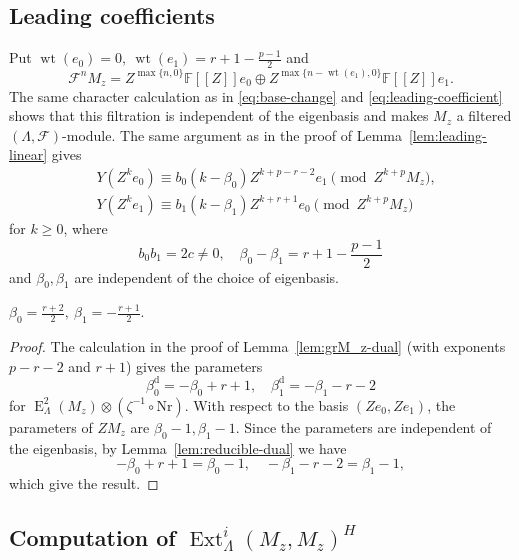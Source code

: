 \documentclass[11pt,a4paper]{article} %
\def\FF{\mathbb{F}}
\def\cF{\mathcal{F}}
\def\d{\operatorname{d}}
\def\E{\operatorname{E}}
\def\Ext{\operatorname{Ext}} %
\def\max{\operatorname{max}}
\def\wet{\operatorname{wt}}
\begin{document}
\subsection{Leading coefficients}
Put $\wet(e_0)=0,~\wet(e_1)=r+1-\frac{p-1}{2}$ and
\[
\cF^nM_z
=Z^{\max\{n,0\}}\FF[[Z]]e_0
\oplus Z^{\max\{n-\wet(e_1),0\}}\FF[[Z]]e_1.
\]
The same character calculation as in \eqref{eq:base-change} and \eqref{eq:leading-coefficient} shows that this filtration
is independent of the eigenbasis and makes $M_z$ a filtered
$(\Lambda,\cF)$-module. The same argument as in the proof of Lemma~\ref{lem:leading-linear} gives
\begin{equation}\label{eq:leading-coefficient-red}
\begin{split}
    &Y(Z^ke_0)\equiv b_0(k-\beta_0)Z^{k+p-r-2}e_1\pmod{Z^{k+p}M_z},\\
    &Y(Z^ke_1)\equiv b_1(k-\beta_1)Z^{k+r+1}e_0\pmod{Z^{k+p}M_z}
\end{split}
\end{equation}
for $k\ge0$, where 
\[
b_0b_1=2c\ne0,\quad\beta_0-\beta_1=r+1-\frac{p-1}{2}
\]
and $\beta_0,\beta_1$ are independent of the choice of eigenbasis.

\begin{proposition}\label{prop:reducible-leading-coefficients}
$\beta_0=\frac{r+2}{2},~\beta_1=-\frac{r+1}{2}$.
\end{proposition}

\begin{proof}
The calculation in the proof of Lemma~\ref{lem:grM_z-dual} (with exponents $p-r-2$ and $r+1$) gives the parameters
\[
\beta_0^{\d}=-\beta_0+r+1,\quad
\beta_1^{\d}=-\beta_1-r-2
\]
for $\E^2_\Lambda(M_z)\otimes(\zeta^{-1}\circ\mathrm{Nr})$. With respect to the basis $(Ze_0,Ze_1)$, the parameters of $ZM_z$ are
$\beta_0-1,\beta_1-1$. Since the parameters are independent of the eigenbasis, by Lemma~\ref{lem:reducible-dual} we have
\[
-\beta_0+r+1=\beta_0-1,\quad
-\beta_1-r-2=\beta_1-1,
\]
which give the result.
\end{proof}

\subsection{Computation of
\texorpdfstring{$\Ext^i_\Lambda(M_z,M_z)^H$}{Exti(Mz,Mz)}}
\end{document}

